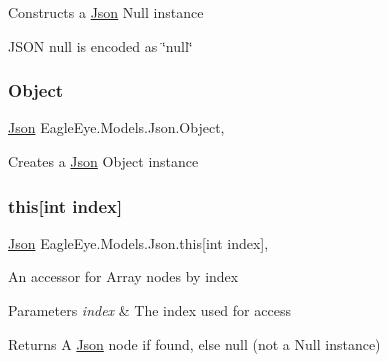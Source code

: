 Constructs a \mbox{\hyperlink{class_eagle_eye_1_1_models_1_1_json}{Json}} Null instance 

J\+S\+ON null is encoded as \char`\"{}null\char`\"{}\mbox{\label{class_eagle_eye_1_1_models_1_1_json_a2196bd75222570b3e481efc887c28bf5}} 
\subsubsection{\texorpdfstring{Object}{Object}}
{\footnotesize\ttfamily \mbox{\hyperlink{class_eagle_eye_1_1_models_1_1_json}{Json}} Eagle\+Eye.\+Models.\+Json.\+Object\hspace{0.3cm}{\ttfamily [static]}, {\ttfamily [get]}}



Creates a \mbox{\hyperlink{class_eagle_eye_1_1_models_1_1_json}{Json}} Object instance 

\mbox{\label{class_eagle_eye_1_1_models_1_1_json_a6a06a70ad6294d135adfa0d66b8b5978}} 
\subsubsection{\texorpdfstring{this[int index]}{this[int index]}}
{\footnotesize\ttfamily \mbox{\hyperlink{class_eagle_eye_1_1_models_1_1_json}{Json}} Eagle\+Eye.\+Models.\+Json.\+this\mbox{[}int index\mbox{]}\hspace{0.3cm}{\ttfamily [get]}, {\ttfamily [set]}}



An accessor for Array nodes by index 


\begin{DoxyParams}{Parameters}
{\em index} & The index used for access\\
\hline
\end{DoxyParams}
\begin{DoxyReturn}{Returns}
A \mbox{\hyperlink{class_eagle_eye_1_1_models_1_1_json}{Json}} node if found, else null (not a Null instance)
\end{DoxyReturn}
\mbox{\label{class_eagle_eye_1_1_models_1_1_json_a5406f24d73c683b7cfd14fcc16e1292b}} 
